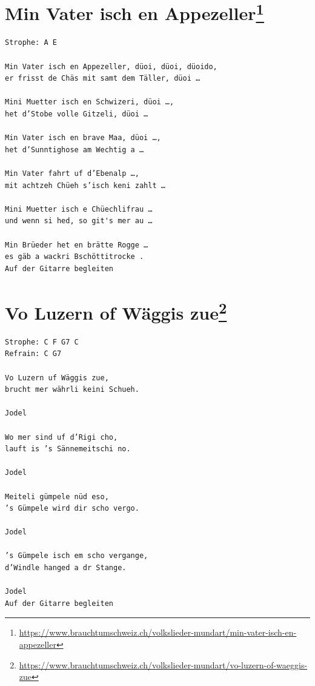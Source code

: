 \documentclass[
]{book}
\let\stdsection\section
\renewcommand\section{\clearpage\stdsection}
\begin{document}
\hypertarget{kinderlieder-min-vatter-isch-en-appizaeller}{%
\section[Min Vater isch en Appezeller]{\texorpdfstring{Min Vater isch en Appezeller\footnote{\url{https://www.brauchtumschweiz.ch/volkslieder-mundart/min-vater-isch-en-appezeller}}}{Min Vater isch en Appezeller}}\label{kinderlieder-min-vatter-isch-en-appizaeller}}

\begin{verbatim}
Strophe: A E

Min Vater isch en Appezeller, düoi, düoi, düoido,
er frisst de Chäs mit samt dem Täller, düoi …

Mini Muetter isch en Schwizeri, düoi …,
het d’Stobe volle Gitzeli, düoi …

Min Vater isch en brave Maa, düoi …,
het d’Sunntighose am Wechtig a …

Min Vater fahrt uf d’Ebenalp …,
mit achtzeh Chüeh s’isch keni zahlt …

Mini Muetter isch e Chüechlifrau …
und wenn si hed, so git's mer au …

Min Brüeder het en brätte Rogge …
es gäb a wackri Bschöttitrocke .
Auf der Gitarre begleiten

\end{verbatim}

\hypertarget{kinderlieder-vo-luzern-gege-weggis}{%
\section[Vo Luzern of Wäggis zue]{\texorpdfstring{Vo Luzern of Wäggis zue\footnote{\url{https://www.brauchtumschweiz.ch/volkslieder-mundart/vo-luzern-of-waeggis-zue}}}{Vo Luzern of Wäggis zue}}\label{kinderlieder-vo-luzern-gege-weggis}}

\begin{verbatim}
Strophe: C F G7 C
Refrain: C G7

Vo Luzern uf Wäggis zue,
brucht mer währli keini Schueh.

Jodel

Wo mer sind uf d’Rigi cho,
lauft is ’s Sännemeitschi no.

Jodel

Meiteli gümpele nüd eso,
’s Gümpele wird dir scho vergo.

Jodel

’s Gümpele isch em scho vergange,
d’Windle hanged a dr Stange.

Jodel
Auf der Gitarre begleiten

\end{verbatim}
\end{document}
